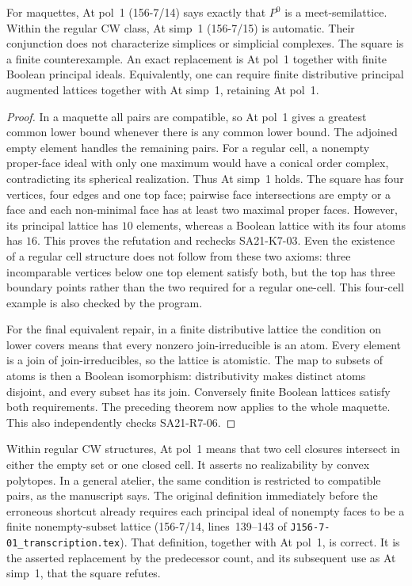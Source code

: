 \begin{theorem}
\label{SA21-C10}
For maquettes, At pol~1 (156-7/14) says exactly that $P^0$ is a
meet-semilattice. Within the regular CW class, At simp~1 (156-7/15)
is automatic. Their conjunction does not characterize simplices or
simplicial complexes. The square is a finite counterexample. An exact
replacement is At pol~1 together with finite Boolean principal ideals.
Equivalently, one can require finite distributive principal augmented
lattices together with At simp~1, retaining At pol~1.
\end{theorem}
\begin{proof}
In a maquette all pairs are compatible, so At pol~1 gives a greatest
common lower bound whenever there is any common lower bound. The
adjoined empty element handles the remaining pairs. For a regular cell,
a nonempty proper-face ideal with only one maximum would have a conical
order complex, contradicting its spherical realization. Thus At simp~1
holds. The square has four vertices, four edges and one top face; pairwise
face intersections are empty or a face and each non-minimal face has
at least two maximal proper faces. However, its principal lattice has
$10$ elements, whereas a Boolean lattice with its four atoms has $16$.
This proves the refutation and rechecks SA21-K7-03.
Even the existence of a regular cell structure does not follow from
these two axioms: three incomparable vertices below one top element
satisfy both, but the top has three boundary points rather than the
two required for a regular one-cell. This four-cell example is also
checked by the program.

For the final equivalent repair, in a finite distributive lattice the
condition on lower covers means that every nonzero join-irreducible is
an atom. Every element is a join of join-irreducibles, so the lattice
is atomistic. The map to subsets of atoms is then a Boolean isomorphism:
distributivity makes distinct atoms disjoint, and every subset has its
join. Conversely finite Boolean lattices satisfy both requirements.
The preceding theorem now applies to the whole maquette. This also
independently checks SA21-R7-06.
\end{proof}

Within regular CW structures, At pol~1 means that two cell closures
intersect in either the empty set or one closed cell. It asserts no
realizability by convex polytopes. In a general atelier, the same
condition is restricted to compatible pairs, as the manuscript says.
The original definition immediately before the erroneous shortcut
already requires each principal ideal of nonempty faces to be a finite
nonempty-subset lattice (156-7/14, lines~139--143 of
\texttt{J156-7-01\_transcription.tex}). That definition, together with
At pol~1, is correct. It is the asserted replacement by the predecessor
count, and its subsequent use as At simp~1, that the square refutes.

